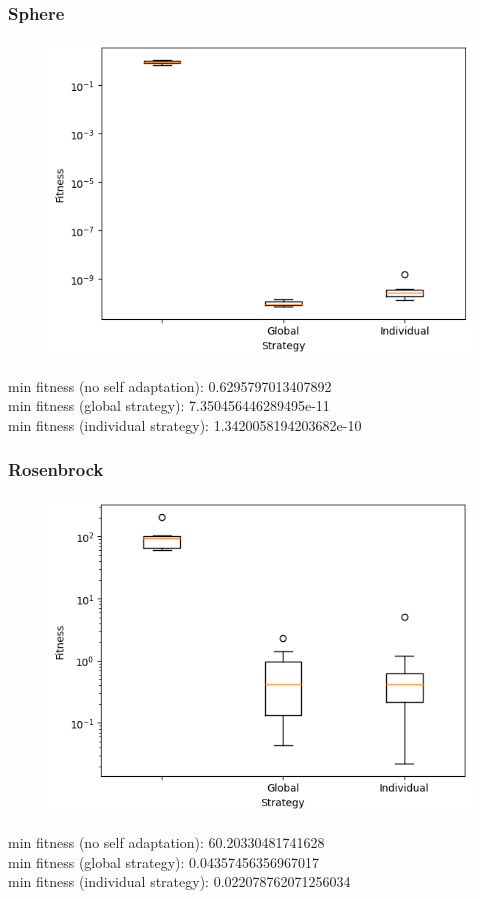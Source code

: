\subsubsection{Sphere}
\begin{figure}[H]
    \centering
    \includegraphics[width=\linewidth]{images/lab3/sph_strat.png}
\end{figure}
min fitness (no self adaptation): 0.6295797013407892 \\
min fitness (global strategy): 7.350456446289495e-11 \\
min fitness (individual strategy): 1.3420058194203682e-10 \\

\subsubsection{Rosenbrock}
\begin{figure}[H]
    \centering
    \includegraphics[width=\linewidth]{images/lab3/ros_strat.png}
\end{figure}
min fitness (no self adaptation): 60.20330481741628  \\
min fitness (global strategy): 0.04357456356967017 \\
min fitness (individual strategy): 0.022078762071256034 \\

